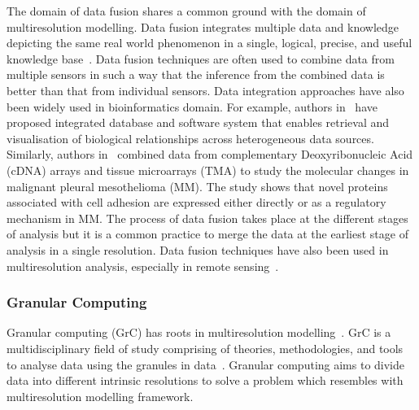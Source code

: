 The domain of data fusion shares a common ground with the domain of 
multiresolution modelling. Data fusion integrates  multiple data and 
knowledge depicting the same real world phenomenon in a single,
logical, precise, and useful knowl\-edge base~\cite{goodman97math}.
Data fusion techniques are often used to combine data from multiple 
sensors in such a way that the inference from the combined data is
better than that from individual sensors.
Data integration approaches have also been widely used in bioinformatics 
domain. For example, authors in~\cite{gopal2005} have proposed 
integrated database and software system that enables retrieval and 
visualisation of biological relationships across heterogeneous data 
sources. Similarly, authors in~\cite{kettunen2003b} combined data 
from complementary Deoxyribonucleic Acid (cDNA) arrays and  
tissue microarrays (TMA) to study the molecular changes in malignant
pleural mesothelioma (MM). The study shows that novel proteins 
associated with cell adhesion  are expressed either directly or 
as a regulatory mechanism in MM. The process of data fusion takes 
place at the different stages of analysis but it is a common 
practice to merge the data at the earliest stage of analysis 
in a single resolution. Data fusion techniques have 
also been used in multiresolution analysis, especially in 
remote sensing~\cite{carter1998analysis}.

\subsubsection{Granular Computing}
\label{ss:granular}

Granular computing (GrC) has roots in multi\-resolution 
modelling~\cite{bargiela2003granular}. GrC is a 
multidisciplinary field of study comprising of the\-ories, 
methodologies, and tools to analyse data using the 
granules in data~\cite{Yao02agranular}. 
Granular computing aims to divide data into 
different intrinsic resolutions to solve a problem which 
resembles with multi\-res\-o\-lu\-tion
modelling framework. 



